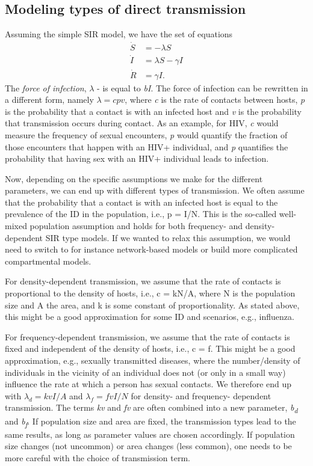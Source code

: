 \documentclass[]{book}
\theoremstyle{definition}
\theoremstyle{definition}
\theoremstyle{definition}
\theoremstyle{remark}
\begin{document}
\hypertarget{myadvancedbox}{%
\subsection{Modeling types of direct transmission}\label{myadvancedbox}}

Assuming the simple SIR model, we have the set of equations \[ 
\begin{aligned}
\dot S &= - \lambda S \\
\dot I &= \lambda S  - \gamma I \\
\dot R &= \gamma I.
\end{aligned}
\] The \emph{force of infection}, \(\lambda\) - is equal to \emph{bI}.
The force of infection can be rewritten in a different form, namely
\(\lambda= cpv\), where \emph{c} is the rate of contacts between hosts,
\emph{p} is the probability that a contact is with an infected host and
\emph{v} is the probability that transmission occurs during contact. As
an example, for HIV, \emph{c} would measure the frequency of sexual
encounters, \emph{p} would quantify the fraction of those encounters
that happen with an HIV+ individual, and \emph{p} quantifies the
probability that having sex with an HIV+ individual leads to infection.

Now, depending on the specific assumptions we make for the different
parameters, we can end up with different types of transmission. We often
assume that the probability that a contact is with an infected host is
equal to the prevalence of the ID in the population, i.e., p = I/N. This
is the so-called well-mixed population assumption and holds for both
frequency- and density-dependent SIR type models. If we wanted to relax
this assumption, we would need to switch to for instance network-based
models or build more complicated compartmental models.

For density-dependent transmission, we assume that the rate of contacts
is proportional to the density of hosts, i.e., c = kN/A, where N is the
population size and A the area, and k is some constant of
proportionality. As stated above, this might be a good approximation for
some ID and scenarios, e.g., influenza.

For frequency-dependent transmission, we assume that the rate of
contacts is fixed and independent of the density of hosts, i.e., c = f.
This might be a good approximation, e.g., sexually transmitted diseases,
where the number/density of individuals in the vicinity of an individual
does not (or only in a small way) influence the rate at which a person
has sexual contacts. We therefore end up with \(\lambda_d= kv I/A\) and
\(\lambda_f= fv I/N\) for density- and frequency- dependent
transmission. The terms \emph{kv} and \emph{fv} are often combined into
a new parameter, \emph{b\textsubscript{d}} and
\emph{b\textsubscript{f}}. If population size and area are fixed, the
transmission types lead to the same results, as long as parameter values
are chosen accordingly. If population size changes (not uncommon) or
area changes (less common), one needs to be more careful with the choice
of transmission term.
\end{document}

